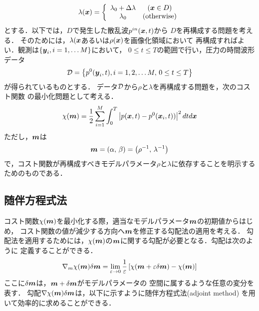 \begin{equation}
	\lambda (\mbox{\boldmath $x$})=
	\left\{
	\begin{array}{cc}
		\lambda_0 +\Delta \lambda & (\mbox{\boldmath $x$}\in D) \\
		\lambda_0 & (\rm otherwise)
	\end{array}
	\right.
	\label{eqn:YYY_rho_x}
\end{equation}
とする．以下では，$D$で発生した散乱波$p^{in}(\mbox{\boldmath $x$},t)$から
$D$を再構成する問題を考える．
そのためには，$\lambda(\mbox{\boldmath $x$}$あるいは$\rho(\mbox{\boldmath $x$})$を画像化領域において
再構成すればよい．観測は$\left\{ \mbox{\boldmath $y$}_i, i=1,\dots M\right\}$において，
$0\leq t\leq T$の範囲で行い，圧力の時間波形データ
\begin{equation}
	{\cal D}
	=
	\left\{ 
		p^{0}(\mbox{\boldmath $y$}_i,t), i=1,2,\dots M, \, 0\leq t \leq T
	\right\}
	\label{eqn:YYY_00}
\end{equation}
が得られているものとする．
データ$\cal D$から$\rho$と$\lambda$を再構成する問題を，次のコスト関数
の最小化問題として考える．
\begin{equation}
	\chi (\mbox{\boldmath $m$})=\frac{1}{2} \sum_{i=1}^M\int_0^T \left| p(\mbox{\boldmath $x$},t)-p^0(\mbox{\boldmath $x$}_i,t))\right|^2dtd\mbox{\boldmath $x$}
	\label{eqn:YYY_01}
\end{equation}
ただし，$\mbox{\boldmath $m$}$は
\begin{equation}
	\mbox{\boldmath $m$}=(\alpha,\,\beta)=\left( \rho^{-1},\, \lambda^{-1} \right)
	\label{eqn:YYY_02}
\end{equation}
で，コスト関数が再構成すべきモデルパラメータ$\rho$と$\lambda$に依存することを明示するためのものである．
\subsection{随伴方程式法}
コスト関数$\chi(\mbox{\boldmath $m$})$を最小化する際，適当なモデルパラメータ$\mbox{\boldmath $m$}$の初期値からはじめ，
コスト関数の値が減少する方向へ$\mbox{\boldmath $m$}$を修正する勾配法の適用を考える．
勾配法を適用するためには，$\chi(\mbox{\boldmath $m$})$の$\mbox{\boldmath $m$}$に関する勾配が必要となる．勾配は次のように
定義することができる．
\begin{equation}
	\nabla_m \chi(\mbox{\boldmath $m$}) 
	\delta \mbox{\boldmath $m$}
	= \lim_{\varepsilon \rightarrow 0}
	\frac{1}{\varepsilon}
	\left[
		\chi(\mbox{\boldmath $m$}+\varepsilon \delta \mbox{\boldmath $m$}) - \chi(\mbox{\boldmath $m$})
	\right]
	\label{eqn:YYY_03}
\end{equation}
ここに$\delta \mbox{\boldmath $m$}$は，$\mbox{\boldmath $m$}+\delta \mbox{\boldmath $m$}$がモデルパラメータの
空間に属するような任意の変分を表す．
勾配$\nabla \chi (\mbox{\boldmath $m$})\delta \mbox{\boldmath $m$}$は，以下に示すように随伴方程式法(adjoint method)
を用いて効率的に求めることができる．

